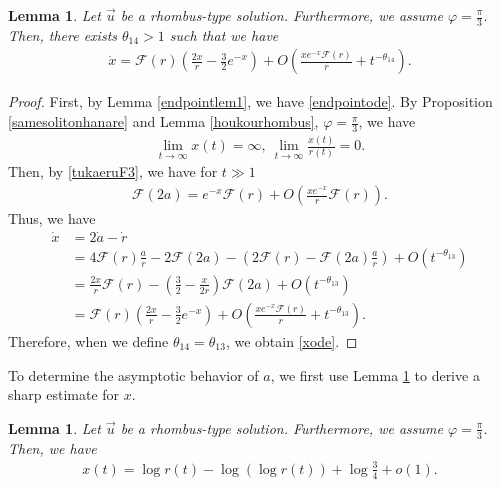 \documentclass[reqno]{amsart}
\theoremstyle{plain}
\newtheorem{lemma}[theorem]{Lemma}
\theoremstyle{definition}
\numberwithin{equation}{section}
\begin{document}
\begin{lemma}\label{xodelem}
Let $\vec{u}$ be a rhombus-type solution. Furthermore, we assume $\varphi=\frac{\pi}{3}$. Then, there exists $\theta_{14}>1$ such that we have
\begin{align}\label{xode}
\dot{x}=\mathcal{F}(r)\left(\frac{2x}{r}-\frac{3}{2}e^{-x}\right)+O\left(\frac{xe^{-x}\mathcal{F}(r)}{r}+t^{-\theta_{14}}\right).
\end{align}
\end{lemma}
\begin{proof}
First, by Lemma \ref{endpointlem1}, we have \eqref{endpointode}. By Proposition \ref{samesolitonhanare} and Lemma \ref{houkourhombus}, $\varphi=\frac{\pi}{3}$, we have
\begin{align}\label{xpcondi}
\lim_{t\to\infty}x(t)=\infty,\ \lim_{t\to\infty}\frac{x(t)}{r(t)}=0.
\end{align}
Then, by \eqref{tukaeruF3}, we have for $t\gg 1$
\begin{align*}
\mathcal{F}(2a)=e^{-x}\mathcal{F}(r)+O\left(\frac{xe^{-x}}{r}\mathcal{F}(r)\right).
\end{align*}
Thus, we have
\begin{align*}
\dot{x}&=2\dot{a}-\dot{r}
\\
&=4\mathcal{F}(r)\frac{a}{r}-2\mathcal{F}(2a)-\left(2\mathcal{F}(r)-\mathcal{F}(2a)\frac{a}{r}\right)+O\left(t^{-\theta_{13}}\right)
\\
&=\frac{2x}{r}\mathcal{F}(r)-\left(\frac{3}{2}-\frac{x}{2r}\right)\mathcal{F}(2a)+O\left(t^{-\theta_{13}}\right)
\\
&=\mathcal{F}(r)\left(\frac{2x}{r}-\frac{3}{2}e^{-x}\right)+O\left(\frac{xe^{-x}\mathcal{F}(r)}{r}+t^{-\theta_{13}}\right).
\end{align*}
Therefore, when we define $\theta_{14}=\theta_{13}$, we obtain \eqref{xode}.




\end{proof}

To determine the asymptotic behavior of $a$, we first use Lemma \ref{xodelem} to derive a sharp estimate for $x$.

\begin{lemma}\label{xsharpeslem}
Let $\vec{u}$ be a rhombus-type solution. Furthermore, we assume $\varphi=\frac{\pi}{3}$. Then, we have
\begin{align}\label{xnagasa}
x(t)=\log{r(t)}-\log{(\log{r(t)})}+\log{\frac{3}{4}}+o(1).
\end{align}
\end{lemma}
\end{document}
